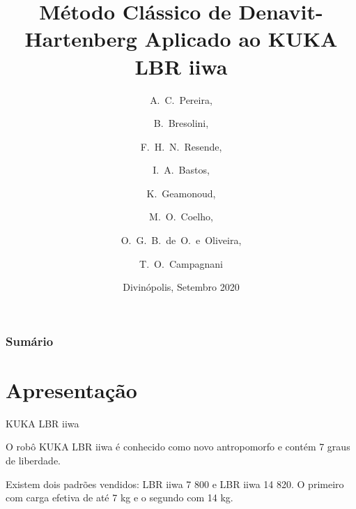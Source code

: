\documentclass[aspectratio=169]{beamer}
\title[Cinemática direta] %
{Método Clássico de Denavit-Hartenberg Aplicado ao KUKA LBR iiwa}
\author[] %
{A.~C.~Pereira\inst{1}, \and
B.~Bresolini\inst{1}, \and
F.~H.~N.~Resende\inst{1}, \and
I.~A.~Bastos\inst{1}, \and
K.~Geamonoud\inst{1}, \and
M.~O.~Coelho\inst{1}, \and
O.~G.~B.~de~O.~e~Oliveira\inst{1}, \and
T.~O.~Campagnani\inst{1}}
\institute[CEFET-MG] %
{
  \inst{1}%
  Graduandos em Eng. Mecatrônica\\
  Departamente de Eng. Mecatrônica, CEFET-MG
}
\date[Divinópolis, 2020] %
{Divinópolis, Setembro 2020}
\begin{document}
\frame{\titlepage}


\begin{frame}
\frametitle{Sumário}
\tableofcontents
\end{frame}


\section{Apresentação}

{
%

\begin{frame}{KUKA LBR iiwa}
\begin{minipage}[t]{0.6\textwidth}
O robô KUKA LBR iiwa é conhecido como novo antropomorfo e contém 7 graus de liberdade.

Existem dois padrões vendidos: LBR iiwa 7 800 e \alert{LBR iiwa 14 820}. O primeiro com carga efetiva de até 7 kg e o segundo com 14 kg.

\end{minipage}%
\end{frame}
}
\end{document}
